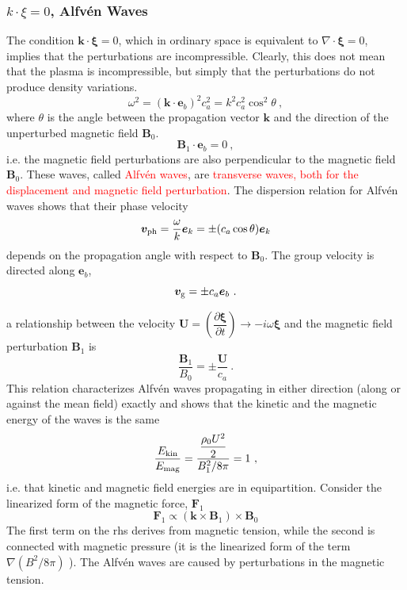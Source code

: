 \documentclass[12pt,a4paper]{article}
\renewcommand{\vec}[1]{\boldsymbol{#1}}
\begin{document}
\subsubsection{ $k \cdot \xi = 0$, Alfv\'en Waves}
The condition $\vec{k} \cdot \vec{\xi} = 0$, which in ordinary space is equivalent to $\nabla \cdot \vec{\xi} = 0$, implies that the perturbations are incompressible. Clearly, this does not mean that the plasma is incompressible, but simply that the perturbations do not produce density variations.
\begin{equation}
\omega^2 = (\vec{k} \cdot \vec{e}_b)^2 c_a^2 = k^2 c_a^2 \cos^2 \theta ~, 
\end{equation}
where $\theta$ is the angle between the propagation vector $\vec{k}$  and the direction of the unperturbed magnetic field $\vec{B}_0$. 
\begin{equation}
\vec{B}_1 \cdot \vec{e}_b = 0 ~,
\end{equation}
i.e. the magnetic field perturbations are also perpendicular to the magnetic field $\vec{B}_0$. These waves, called \textcolor{red}{Alfv\'en waves}, are \textcolor{red}{transverse waves, both for the displacement and magnetic field perturbation}. The dispersion relation for Alfv\'en waves shows that their phase velocity
\begin{equation*}
\vec{v}_{\rm ph} = \frac{\omega}{k} \vec{e}_k = \pm (c_a \cos \theta) \vec{e}_k
\end{equation*}
depends on the propagation angle with respect to $\vec{B}_0$. The group velocity is directed along $\vec{e}_b$,
\begin{equation}
\vec{v}_{\rm g} = \pm c_a \vec{e}_b ~.
\end{equation}


a relationship between the velocity $\vec{U} = \left(\dfrac{\partial \vec{\xi}}{\partial t} \right) \rightarrow -i\omega \vec{\xi}$ and the magnetic field perturbation $\vec{B}_1$ is
\begin{equation}
\dfrac{\vec{B}_1}{B_0} = \pm \dfrac{\vec{U}}{c_a} ~.
\end{equation}
This relation characterizes Alfv\'en waves propagating in either direction (along or against the mean field) exactly and shows that the kinetic and the magnetic energy of the waves is the same
\begin{equation*}
\dfrac{E_{\rm kin} }{E_{\rm mag}} = \dfrac{\dfrac{\rho_0 U^2}{2} }{B_1^2/8\pi} = 1 ~,
\end{equation*}
i.e. that kinetic and magnetic field energies are in equipartition. Consider the linearized form of the magnetic force, $\vec{F}_1$
\begin{equation*}
\vec{F}_1 \propto (\vec{k} \times \vec{B}_1) \times \vec{B}_0
\end{equation*}
The first term on the rhs derives from magnetic tension, while the second is connected with magnetic pressure (it is the linearized form of the term $\nabla(B^2/8\pi)$ ). The Alfv\'en waves are caused by perturbations in the magnetic tension. 
\end{document}
